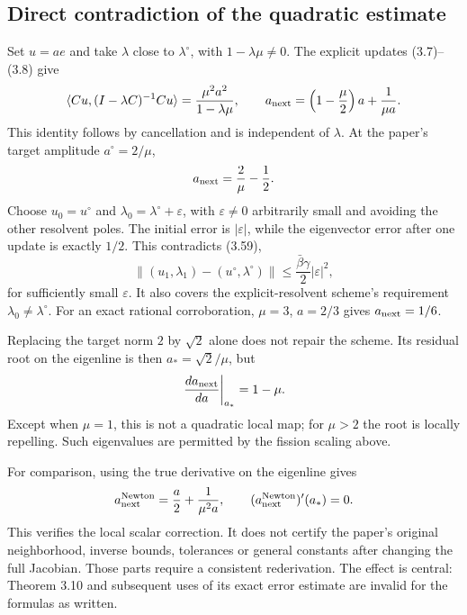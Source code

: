 \documentclass[10pt]{article}
\begin{document}
\subsection*{Direct contradiction of the quadratic estimate}
Set \(u=ae\) and take \(\lambda\) close to \(\lambda^\circ\), with \(1-\lambda\mu\ne0\). The explicit updates (3.7)–(3.8) give \[\langle Cu,(I-\lambda C)^{-1}Cu\rangle=\frac{\mu^2a^2}{1-\lambda\mu},
\qquad
a_{\rm next}
=\left(1-\frac\mu2\right)a+\frac1{\mu a}.\] This identity follows by cancellation and is independent of \(\lambda\). At the paper’s target amplitude \(a^\circ=2/\mu\), \[a_{\rm next}=\frac2\mu-\frac12.\] Choose \(u_0=u^\circ\) and \(\lambda_0=\lambda^\circ+\varepsilon\), with \(\varepsilon\ne0\) arbitrarily small and avoiding the other resolvent poles. The initial error is \(|\varepsilon|\), while the eigenvector error after one update is exactly \(1/2\). This contradicts (3.59), \[\|(u_1,\lambda_1)-(u^\circ,\lambda^\circ)\|
 \le \frac{\bar\beta\gamma}{2}|\varepsilon|^2,\] for sufficiently small \(\varepsilon\). It also covers the explicit-resolvent scheme’s requirement \(\lambda_0\ne\lambda^\circ\). For an exact rational corroboration, \(\mu=3\), \(a=2/3\) gives \(a_{\rm next}=1/6\).\par
Replacing the target norm \(2\) by \(\sqrt2\) alone does not repair the scheme. Its residual root on the eigenline is then \(a_*=\sqrt2/\mu\), but \[\left.\frac{d a_{\rm next}}{da}\right|_{a_*}=1-\mu.\] Except when \(\mu=1\), this is not a quadratic local map; for \(\mu>2\) the root is locally repelling. Such eigenvalues are permitted by the fission scaling above.\par
For comparison, using the true derivative on the eigenline gives \[a_{\rm next}^{\rm Newton}=\frac a2+\frac1{\mu^2a},
\qquad
(a_{\rm next}^{\rm Newton})'(a_*)=0.\] This verifies the local scalar correction. It does not certify the paper’s original neighborhood, inverse bounds, tolerances or general constants after changing the full Jacobian. Those parts require a consistent rederivation. The effect is central: Theorem 3.10 and subsequent uses of its exact error estimate are invalid for the formulas as written.\par
\end{document}
